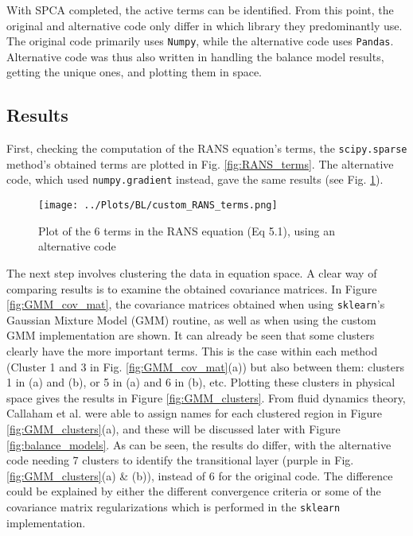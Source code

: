 \documentclass[12pt]{report} %
\begin{document}
With SPCA completed, the active terms can be identified. From this point, the original and alternative code only differ in which library they predominantly use. The original code primarily uses \texttt{Numpy}, while the alternative code uses \texttt{Pandas}. Alternative code was thus also written in handling the balance model results, getting the unique ones, and plotting them in space.


\subsection{Results}

First, checking the computation of the RANS equation's terms, the \texttt{scipy.sparse} method's obtained terms are plotted in Fig. \ref{fig:RANS_terms}. The alternative code, which used \texttt{numpy.gradient} instead, gave the same results (see Fig. \ref{fig:custom_RANS_terms}).

\begin{figure}[htbp]
  \centering
  \texttt{[image: ../Plots/BL/custom\_RANS\_terms.png]}
  \caption{Plot of the 6 terms in the RANS equation (Eq 5.1), using an alternative code}
  \label{fig:custom_RANS_terms}
\end{figure}

The next step involves clustering the data in equation space. A clear way of comparing results is to examine the obtained covariance matrices. In Figure \ref{fig:GMM_cov_mat}, the covariance matrices obtained when using \texttt{sklearn}’s Gaussian Mixture Model (GMM) routine, as well as when using the custom GMM implementation are shown. It can already be seen that some clusters clearly have the more important terms. This is the case within each method (Cluster 1 and 3 in Fig. \ref{fig:GMM_cov_mat}(a)) but also between them: clusters 1 in (a) and (b), or 5 in (a) and 6 in (b), etc. Plotting these clusters in physical space gives the results in Figure \ref{fig:GMM_clusters}. From fluid dynamics theory, Callaham et al. were able to assign names for each clustered region in Figure \ref{fig:GMM_clusters}(a), and these will be discussed later with Figure \ref{fig:balance_models}. As can be seen, the results do differ, with the alternative code needing 7 clusters to identify the transitional layer (purple in Fig. \ref{fig:GMM_clusters}(a) \& (b)), instead of 6 for the original code. The difference could be explained by either the different convergence criteria or some of the covariance matrix regularizations which is performed in the \texttt{sklearn} implementation\cite{sklearnGMM}.
\end{document}
